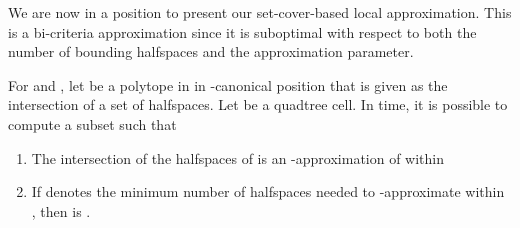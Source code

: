 \documentclass[11pt]{article}   \usepackage[letterpaper,hmargin=2.1cm,vmargin=3cm]{geometry}
\begin{document}
We are now in a position to present our set-cover-based local approximation. This is a bi-criteria approximation since it is suboptimal with respect to both the number of bounding halfspaces and the approximation parameter.

\begin{lemma} \label{lem:apx-cover}
For  and , let  be a polytope in  in -canonical position that is given as the intersection of a set  of  halfspaces. Let  be a quadtree cell. In  time, it is possible to compute a subset  such that  
\begin{enumerate}
\setlength{\itemsep}{-0.5ex}\setlength{\parsep}{0pt}\item[] The intersection of the halfspaces of  is an -approximation of  within 

\item[] If  denotes the minimum number of halfspaces needed to -approximate  within , then  is .
\end{enumerate}
\end{lemma}
\end{document}
